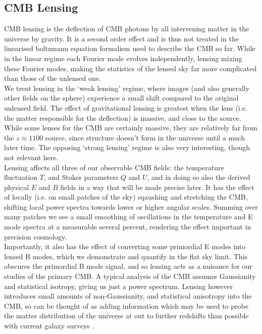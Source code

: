 \documentclass[a4paper,10pt]{article}
\begin{document}
\subsection{CMB Lensing}
\label{lensing}
CMB lensing is the deflection of CMB photons by all intervening matter in the universe by gravity. It is a second order effect and is thus not treated in the linearised boltzmann equation formalism used to describe the CMB so far. While in the linear regime each Fourier mode evolves independently, lensing mixing these Fourier modes, making the statistics of the lensed sky far more complicated than those of the unlensed one. \\

We treat lensing in the `weak lensing' regime, where images (and also generally other fields on the sphere) experience a small shift compared to the original unlensed field. The effect of gravitational lensing is greatest when the lens (i.e. the matter responsible for the deflection) is massive, and close to the source. While some lenses for the CMB are certainly massive, they are relatively far from the $z\approx1100$ source, since structure doesn't form in the universe until a much later time. The opposing `strong lensing' regime is also very interesting, though not relevant here.\\

Lensing affects all three of our observable CMB fields: the temperature fluctuation $T$, and Stokes parameters $Q$ and $U$, and in doing so also the derived physical $E$ and $B$ fields in a way that will be made precise later. It has the effect of locally (i.e. on small patches of the sky) sqaushing and stretching the CMB, shifting local power spectra towards lower or higher angular scales. Summing over many patches we see a small smoothing of oscillations in the temperature and E mode spectra at a measurable several percent, rendering the effect important in precision cosmology. \\

Importantly, it also has the effect of converting some primordial E modes into lensed B modes, which we demonstrate and quantify in the flat sky limit. This obscures the primordial B mode signal, and so lensing acts as a nuisance for our studies of the primary CMB.  A typical analysis of the CMB assumes Gaussianity and statistical isotropy, giving us just a power spectrum. Lensing however introduces small amounts of non-Gaussianity, and statistical anisotropy into the CMB, so can be thought of as adding information which may be used to probe the matter distribution of the universe at out to further redshifts than possible with current galaxy surveys \cite{sloan}.
\end{document}
